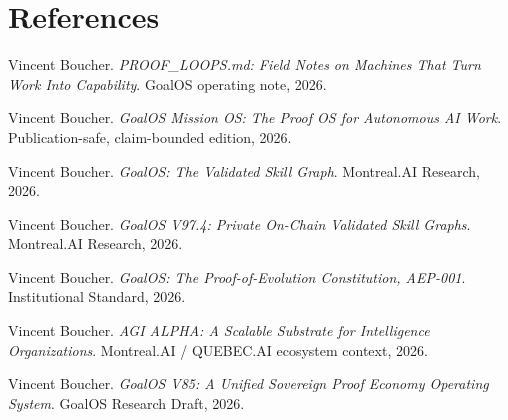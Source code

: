 \documentclass[11pt]{article}
\begin{document}
\section*{References}
\begin{enumerate}[label={[\arabic*]},leftmargin=1.8em]
\item Vincent Boucher. \emph{PROOF\_LOOPS.md: Field Notes on Machines That Turn Work Into Capability}. GoalOS operating note, 2026.
\item Vincent Boucher. \emph{GoalOS Mission OS: The Proof OS for Autonomous AI Work}. Publication-safe, claim-bounded edition, 2026.
\item Vincent Boucher. \emph{GoalOS: The Validated Skill Graph}. Montreal.AI Research, 2026.
\item Vincent Boucher. \emph{GoalOS V97.4: Private On-Chain Validated Skill Graphs}. Montreal.AI Research, 2026.
\item Vincent Boucher. \emph{GoalOS: The Proof-of-Evolution Constitution, AEP-001}. Institutional Standard, 2026.
\item Vincent Boucher. \emph{AGI ALPHA: A Scalable Substrate for Intelligence Organizations}. Montreal.AI / QUEBEC.AI ecosystem context, 2026.
\item Vincent Boucher. \emph{GoalOS V85: A Unified Sovereign Proof Economy Operating System}. GoalOS Research Draft, 2026.
\end{enumerate}
\end{document}
